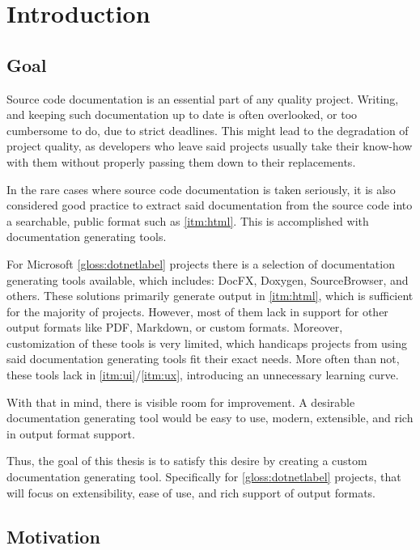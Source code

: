\chapter*{Introduction}

\section*{Goal}

Source code documentation is an essential part of any quality project. Writing, and keeping such documentation up to date is often overlooked, or too cumbersome to do, due to strict deadlines. This might lead to the degradation of project quality, as developers who leave said projects usually take their know-how with them without properly passing them down to their replacements.

In the rare cases where source code documentation is taken seriously, it is also considered good practice to extract said documentation from the source code into a searchable, public format such as \ref{itm:html}. This is accomplished with documentation generating tools.

For Microsoft \ref{gloss:dotnetlabel} projects there is a selection of documentation generating tools available, which includes: DocFX, Doxygen, SourceBrowser, and others. These solutions primarily generate output in \ref{itm:html}, which is sufficient for the majority of projects. However, most of them lack in support for other output formats like PDF, Markdown, or custom formats. Moreover, customization of these tools is very limited, which handicaps projects from using said documentation generating tools fit their exact needs. More often than not, these tools lack in \ref{itm:ui}/\ref{itm:ux}, introducing an unnecessary learning curve.

With that in mind, there is visible room for improvement. A desirable documentation generating tool would be easy to use, modern, extensible, and rich in output format support.

Thus, the goal of this thesis is to satisfy this desire by creating a custom documentation generating tool. Specifically for \ref{gloss:dotnetlabel} projects, that will focus on extensibility, ease of use, and rich support of output formats.

\section*{Motivation}

